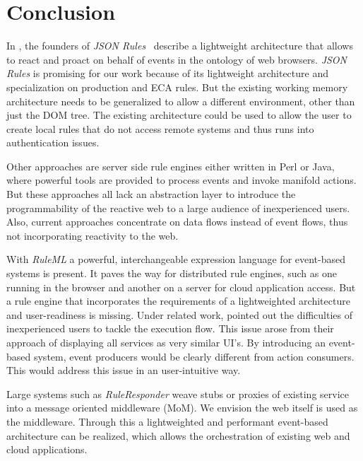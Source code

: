\documentclass[11pt]{article}%
\begin{document}
\section{Conclusion}
In \cite{2009-Pascalau_Giurca-LWAECARE.pdf}, the founders of \emph{JSON Rules}~\cite{2008-Giurca_Pascalau-JSON_Rules.pdf} describe a lightweight architecture that allows to react and proact on behalf of events in the ontology of web browsers. \emph{JSON Rules} is promising for our work because of its lightweight architecture and specialization on production and ECA rules. But the existing working memory architecture needs to be generalized to allow a different environment, other than just the DOM tree. The existing architecture could be used to allow the user to create local rules that do not access remote systems and thus runs into authentication issues.

Other approaches are server side rule engines either written in Perl or Java, where powerful tools are provided to process events and invoke manifold actions. But these approaches all lack an abstraction layer to introduce the programmability of the reactive web to a large audience of inexperienced users. Also, current approaches concentrate on data flows instead of event flows, thus not incorporating reactivity to the web.

With \emph{RuleML} a powerful, interchangeable expression language for event-based systems is present. It paves the way for distributed rule engines, such as one running in the browser and another on a server for cloud application access. But a rule engine that incorporates the requirements of a lightweighted architecture and user-readiness is missing. Under related work, \cite{2010-Namoun_etal-EURCW.pdf} pointed out the difficulties of inexperienced users to tackle the execution flow. This issue arose from their approach of displaying all services as very similar UI's. By introducing an event-based system, event producers would be clearly different from action consumers. This would address this issue in an user-intuitive way.

Large systems such as \emph{RuleResponder} weave stubs or proxies of existing service into a message oriented middleware (MoM). We envision the web itself is used as the middleware. Through this a lightweighted and performant event-based architecture can be realized, which allows the orchestration of existing web and cloud applications.
\end{document}

